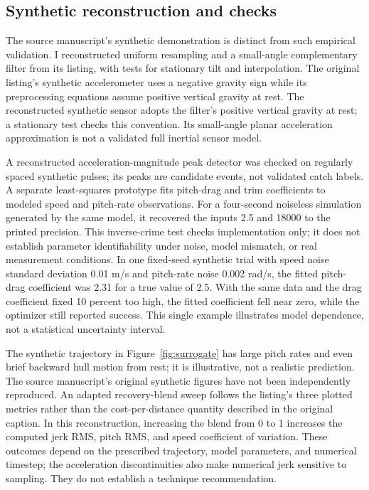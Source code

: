 \documentclass[11pt]{article}
\begin{document}
\subsection{Synthetic reconstruction and checks}
The source manuscript's synthetic demonstration is distinct from such empirical validation. I reconstructed uniform resampling and a small-angle complementary filter from its listing, with tests for stationary tilt and interpolation. The original listing's synthetic accelerometer uses a negative gravity sign while its preprocessing equations assume positive vertical gravity at rest. The reconstructed synthetic sensor adopts the filter's positive vertical gravity at rest; a stationary test checks this convention. Its small-angle planar acceleration approximation is not a validated full inertial sensor model. 

A reconstructed acceleration-magnitude peak detector was checked on regularly spaced synthetic pulses; its peaks are candidate events, not validated catch labels. A separate least-squares prototype fits pitch-drag and trim coefficients to modeled speed and pitch-rate observations. For a four-second noiseless simulation generated by the same model, it recovered the inputs 2.5 and 18000 to the printed precision. This inverse-crime test checks implementation only; it does not establish parameter identifiability under noise, model mismatch, or real measurement conditions. In one fixed-seed synthetic trial with speed noise standard deviation 0.01 m/s and pitch-rate noise 0.002 rad/s, the fitted pitch-drag coefficient was 2.31 for a true value of 2.5. With the same data and the drag coefficient fixed 10 percent too high, the fitted coefficient fell near zero, while the optimizer still reported success. This single example illustrates model dependence, not a statistical uncertainty interval. 

The synthetic trajectory in Figure~\ref{fig:surrogate} has large pitch rates and even brief backward hull motion from rest; it is illustrative, not a realistic prediction. The source manuscript's original synthetic figures have not been independently reproduced. An adapted recovery-blend sweep follows the listing's three plotted metrics rather than the cost-per-distance quantity described in the original caption. In this reconstruction, increasing the blend from 0 to 1 increases the computed jerk RMS, pitch RMS, and speed coefficient of variation. These outcomes depend on the prescribed trajectory, model parameters, and numerical timestep; the acceleration discontinuities also make numerical jerk sensitive to sampling. They do not establish a technique recommendation. 
\end{document}
